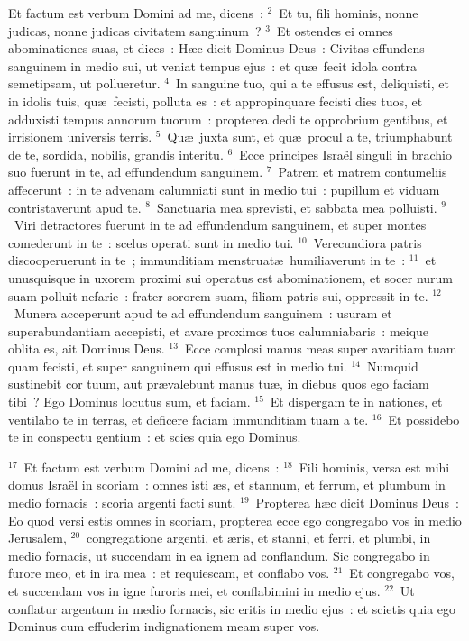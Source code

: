 \bchapter
\lettrine[lines=3,image=true,loversize=0.05,lraise=-0.03]{E}{}t factum est verbum Domini ad me, dicens~:
${}^{2}$~Et tu, fili hominis, nonne judicas, nonne judicas civitatem sanguinum~?
${}^{3}$~Et ostendes ei omnes abominationes suas, et dices~: H\ae c dicit Dominus Deus~: Civitas effundens sanguinem in medio sui, ut veniat tempus ejus~: et qu\ae\ fecit idola contra semetipsam, ut pollueretur.
${}^{4}$~In sanguine tuo, qui a te effusus est, deliquisti, et in idolis tuis, qu\ae\ fecisti, polluta es~: et appropinquare fecisti dies tuos, et adduxisti tempus annorum tuorum~: propterea dedi te opprobrium gentibus, et irrisionem universis terris.
${}^{5}$~Qu\ae\ juxta sunt, et qu\ae\ procul a te, triumphabunt de te, sordida, nobilis, grandis interitu.
${}^{6}$~Ecce principes Isra\"el singuli in brachio suo fuerunt in te, ad effundendum sanguinem.
${}^{7}$~Patrem et matrem contumeliis affecerunt~: in te advenam calumniati sunt in medio tui~: pupillum et viduam contristaverunt apud te.
${}^{8}$~Sanctuaria mea sprevisti, et sabbata mea polluisti.
${}^{9}$~Viri detractores fuerunt in te ad effundendum sanguinem, et super montes comederunt in te~: scelus operati sunt in medio tui.
${}^{10}$~Verecundiora patris discooperuerunt in te~; immunditiam menstruat\ae\ humiliaverunt in te~:
${}^{11}$~et unusquisque in uxorem proximi sui operatus est abominationem, et socer nurum suam polluit nefarie~: frater sororem suam, filiam patris sui, oppressit in te.
${}^{12}$~Munera acceperunt apud te ad effundendum sanguinem~: usuram et superabundantiam accepisti, et avare proximos tuos calumniabaris~: meique oblita es, ait Dominus Deus.
${}^{13}$~Ecce complosi manus meas super avaritiam tuam quam fecisti, et super sanguinem qui effusus est in medio tui.
${}^{14}$~Numquid sustinebit cor tuum, aut pr\ae valebunt manus tu\ae , in diebus quos ego faciam tibi~? Ego Dominus locutus sum, et faciam.
${}^{15}$~Et dispergam te in nationes, et ventilabo te in terras, et deficere faciam immunditiam tuam a te.
${}^{16}$~Et possidebo te in conspectu gentium~: et scies quia ego Dominus.


${}^{17}$~Et factum est verbum Domini ad me, dicens~:
${}^{18}$~Fili hominis, versa est mihi domus Isra\"el in scoriam~: omnes isti \ae s, et stannum, et ferrum, et plumbum in medio fornacis~: scoria argenti facti sunt.
${}^{19}$~Propterea h\ae c dicit Dominus Deus~: Eo quod versi estis omnes in scoriam, propterea ecce ego congregabo vos in medio Jerusalem,
${}^{20}$~congregatione argenti, et \ae ris, et stanni, et ferri, et plumbi, in medio fornacis, ut succendam in ea ignem ad conflandum. Sic congregabo in furore meo, et in ira mea~: et requiescam, et conflabo vos.
${}^{21}$~Et congregabo vos, et succendam vos in igne furoris mei, et conflabimini in medio ejus.
${}^{22}$~Ut conflatur argentum in medio fornacis, sic eritis in medio ejus~: et scietis quia ego Dominus cum effuderim indignationem meam super vos.


